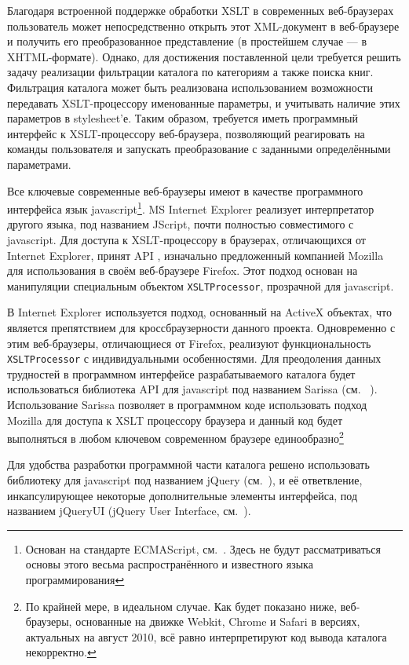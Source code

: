 \documentclass[a4paper,14pt,oneside]{extreport}
\begin{document}
Благодаря встроенной поддержке обработки XSLT в современных веб-браузерах пользователь может непосредственно открыть этот XML-документ в веб-браузере и получить его преобразованное представление (в простейшем случае --- в XHTML-формате). Однако, для достижения поставленной цели требуется решить задачу реализации фильтрации каталога по категориям а также поиска книг. Фильтрация каталога может быть реализована использованием возможности передавать XSLT-процессору именованные параметры, и учитывать наличие этих параметров в stylesheet'е. Таким образом, требуется иметь программный интерфейс к XSLT-процессору веб-браузера, позволяющий реагировать на команды пользователя и запускать преобразование с заданными определёнными параметрами.

Все ключевые современные веб-браузеры имеют в качестве программного интерфейса язык javascript\footnote{Основан на стандарте ECMAScript, см.~\cite{ECMAScript-spec}. Здесь не будут рассматриваться основы этого весьма распространённого и известного языка программирования}. MS Internet Explorer реализует интерпретатор другого языка, под названием JScript, почти полностью совместимого с javascript. Для доступа к XSLT-процессору в браузерах, отличающихся от Internet Explorer, принят API \cite{Mozilla-JS-XSLT-API}, изначально предложенный компанией Mozilla для использования в своём веб-браузере Firefox. Этот подход основан на манипуляции специальным объектом \verb'XSLTProcessor', прозрачной для javascript. 

В Internet Explorer используется подход, основанный на ActiveX объектах, что является препятствием для кроссбраузерности данного проекта. Одновременно с этим веб-браузеры, отличающиеся от Firefox, реализуют функциональность \verb'XSLTProcessor' с индивидуальными особенностями. Для преодоления данных трудностей в программном интерфейсе разрабатываемого каталога будет использоваться библиотека API для javascript под названием Sarissa (см. ~\cite{Sarissa-website}). Использование Sarissa позволяет в программном коде использовать подход Mozilla для доступа к XSLT процессору браузера и данный код будет выполняться в любом ключевом современном браузере единообразно\footnote{По крайней мере, в идеальном случае. Как будет показано ниже, веб-браузеры, основанные на движке Webkit, Chrome и Safari в версиях, актуальных на август 2010, всё равно интерпретируют код вывода каталога некорректно.}

Для удобства разработки программной части каталога решено использовать библиотеку для javascript под названием jQuery (см.~\cite{jQuery-website}), и её ответвление, инкапсулирующее некоторые дополнительные элементы интерфейса, под названием jQueryUI (jQuery User Interface, см.~\cite{jQueryUI-website}).
\end{document}

